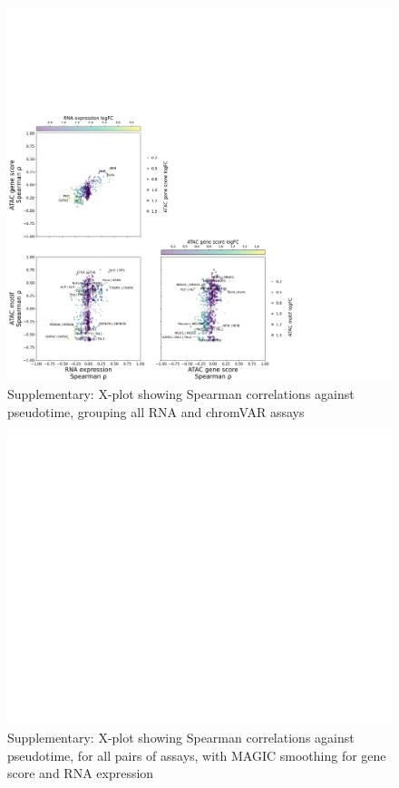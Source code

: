 \documentclass[a4paper]{article}
\begin{document}
\begin{figure}[!htb]
  \centering
  \includegraphics[width=\textwidth]{../figures/hematopoiesis/Myeloid DC_40_107_smooth_none_grouped_X_plot.png}
  \caption{Supplementary: X-plot showing Spearman correlations against pseudotime, grouping all RNA and chromVAR assays}
\end{figure}


\begin{figure}[!htb]
  \centering
  \includegraphics[width=\textwidth]{../figures/hematopoiesis/Myeloid DC_40_107_smooth_magic_detailed_X_plot.png}
  \caption{Supplementary: X-plot showing Spearman correlations against pseudotime, for all pairs of assays, with MAGIC smoothing for gene score and RNA expression}
\end{figure}
\end{document}
